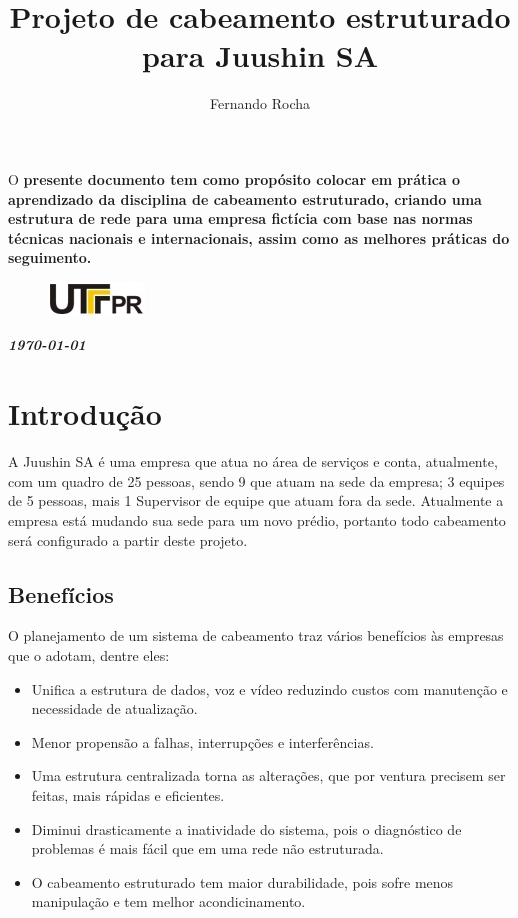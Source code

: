 \documentclass[	DIV=calc,%
paper=a4,%
fontsize=12pt,%
onecolumn]{scrartcl}	 					%
\title{Projeto de cabeamento estruturado para Juushin SA}
\author{Fernando Rocha }  	%
\date{}																				%
\newcommand{\initial}[1]{%
	\lettrine[lines=3,lhang=0.3,nindent=0em]{
		\color{DarkGoldenrod}
		{\textsf{#1}}}{}}
\begin{document}
	\maketitle
	\thispagestyle{fancy} 	
	\thispagestyle{empty}		%
	
	\initial{O}\textbf{ presente documento tem como propósito colocar em prática o aprendizado da disciplina de cabeamento estruturado, criando uma estrutura de rede para uma empresa fictícia com base nas normas técnicas nacionais e internacionais, assim como as melhores práticas do seguimento.}
	
	
	\begin{figure}
		\centering
		\includegraphics{utfpr}
	\end{figure}
	
	\vspace{2cm}
	\centerline{\textit{\textbf{\today}}}
	
	\clearpage
	\renewcommand*\listfigurename{Lista de figuras}
	\listoffigures
	
	\renewcommand*\listtablename{Lista de tabelas}
	\listoftables
	
	
	
	
	\clearpage
	\renewcommand{\contentsname}{Sumário}
	\tableofcontents
	\clearpage
	
	
	\section{Introdução}
	A Juushin SA é uma empresa que atua no área de serviços e conta, atualmente, com um quadro de 25 pessoas, sendo 9 que atuam na sede da empresa; 3 equipes de 5 pessoas, mais 1 Supervisor de equipe que atuam fora da sede. Atualmente a empresa está mudando sua sede para um novo prédio, portanto todo cabeamento será configurado a partir deste projeto.
	
	\subsection{Benefícios}
	
	O planejamento de um sistema de cabeamento traz vários benefícios às empresas que o adotam, dentre eles:
	\begin{itemize}
		\item Unifica a estrutura de dados, voz e vídeo reduzindo custos com manutenção e necessidade de atualização.
		\item Menor propensão a falhas, interrupções e interferências.
		\item Uma estrutura centralizada torna as alterações, que por ventura precisem ser feitas, mais rápidas e eficientes.
		\item Diminui drasticamente a inatividade do sistema, pois o diagnóstico de problemas é mais fácil que em uma rede não estruturada.
		\item O cabeamento estruturado tem maior durabilidade, pois sofre menos manipulação e tem melhor acondicinamento. 
	\end{itemize}
\end{document}
